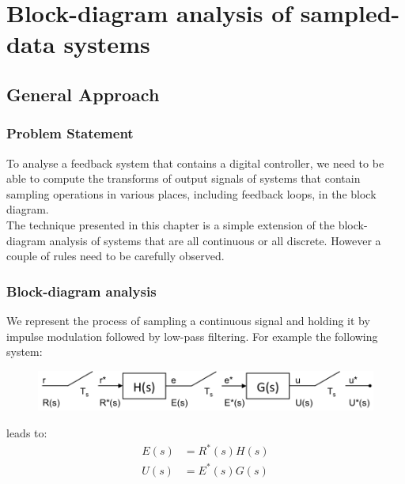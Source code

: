 \section{Block-diagram analysis of sampled-data systems}

\subsection{General Approach}

\begin{frame}
	\frametitle{Problem Statement}
	\justify
	To analyse a feedback system that contains a digital controller, we need to be able to compute the transforms of output signals of systems that contain sampling operations in various places, including feedback loops, in the block diagram.\\
	\vspace{1em}
	The technique presented in this chapter is a simple extension of the block-diagram analysis of systems that are all continuous or all discrete. However a couple of rules need to be carefully observed. 
\end{frame}

\begin{frame}
	\frametitle{Block-diagram analysis}
	\justify
	We represent the process of sampling a continuous signal and holding it by impulse modulation followed by low-pass filtering. For example the following system: 
	\vspace{1em}
	\begin{figure}
		\centering
		\includegraphics[width=1\linewidth]{block_analysis_1}
		\vspace{0.5em}
	\end{figure}
	leads to:
	\begin{equation}
		\begin{split}
		E(s) &= R^{*}(s)H(s)\\
		U(s) &= E^{*}(s)G(s)
		\end{split}
	\end{equation}
\end{frame}


